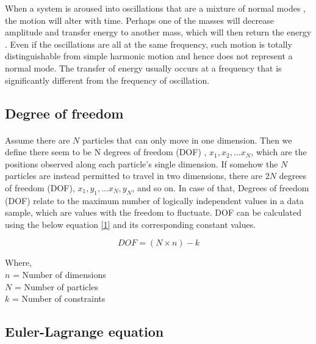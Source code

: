 When a system is aroused into oscillations that are a mixture of normal modes \cite{cochelin20197th}, the motion will alter with time. Perhaps one of the masses will decrease amplitude and transfer energy to another mass, which will then return the energy \cite{kerschen2009nonlinear}. Even if the oscillations are all at the same frequency, such motion is totally distinguishable from simple harmonic motion and hence does not represent a normal mode. The transfer of energy usually occurs at a frequency that is significantly different from the frequency of oscillation.

\subsection{Degree of freedom}

\paragraph{}

Assume there are $N$ particles that can only move in one dimension. Then we define there seem to be N degrees of freedom (DOF) \cite{rosenberg1962normal}, $x_1, x_2,...x_N$, which are the positions observed along each particle's single dimension. If somehow the $N$ particles are instead permitted to travel in two dimensions, there are $2N$ degrees of freedom (DOF), $x_1, y_1,...x_N, y_N$, and so on. In case of that, Degrees of freedom (DOF) relate to the maximum number of logically independent values in a data sample, which are values with the freedom to fluctuate. DOF can be calculated using the below equation \eqref{1} and its corresponding constant values. 

\begin{equation}
    \label{1}
    DOF = (N \times n ) - k
\end{equation}

Where, \\
$n$ =  Number of dimensions \\
$N$ = Number of particles\\
$k$ = Number of constraints


\subsection{Euler-Lagrange equation}
\label{lag}

\paragraph{}


